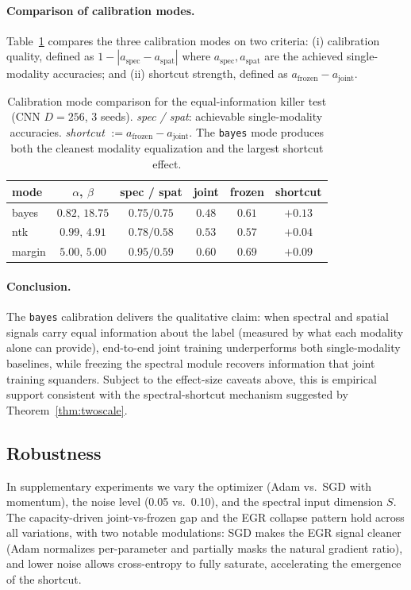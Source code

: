 \paragraph{Comparison of calibration modes.}
Table~\ref{tab:calib_modes} compares the three calibration modes on two
criteria: (i) calibration quality, defined as $1 -
|a_{\mathrm{spec}} - a_{\mathrm{spat}}|$ where $a_{\mathrm{spec}},
a_{\mathrm{spat}}$ are the achieved single-modality accuracies; and (ii)
shortcut strength, defined as $a_{\mathrm{frozen}} - a_{\mathrm{joint}}$.

\begin{table}[h]
\centering
\begin{tabular}{lccccc}
\toprule
mode    & $\alpha$, $\beta$    & spec / spat & joint & frozen & shortcut \\
\midrule
bayes   & $0.82,\, 18.75$ & $0.75 / 0.75$ & $0.48$ & $0.61$ & $\mathbf{+0.13}$ \\
ntk     & $0.99,\, 4.91$  & $0.78 / 0.58$ & $0.53$ & $0.57$ & $+0.04$ \\
margin  & $5.00,\, 5.00$  & $0.95 / 0.59$ & $0.60$ & $0.69$ & $+0.09$ \\
\bottomrule
\end{tabular}
\caption{Calibration mode comparison for the equal-information killer
test (CNN $D=256$, $3$ seeds). \emph{spec / spat}: achievable
single-modality accuracies. \emph{shortcut} $:= a_{\mathrm{frozen}} -
a_{\mathrm{joint}}$. The \texttt{bayes} mode produces both the cleanest
modality equalization and the largest shortcut effect.}
\label{tab:calib_modes}
\end{table}

\paragraph{Conclusion.} The \texttt{bayes} calibration delivers the
qualitative claim: when spectral and spatial signals carry equal
information about the label (measured by what each modality alone can
provide), end-to-end joint training underperforms both single-modality
baselines, while freezing the spectral module recovers information
that joint training squanders. Subject to the effect-size caveats
above, this is empirical support consistent with the
spectral-shortcut mechanism suggested by
Theorem~\ref{thm:twoscale}.

\subsection{Robustness}

In supplementary experiments we vary the optimizer (Adam vs.\ SGD with
momentum), the noise level (0.05 vs.\ 0.10), and the spectral input
dimension $S$. The capacity-driven joint-vs-frozen gap and the EGR
collapse pattern hold across all variations, with two notable
modulations: SGD makes the EGR signal cleaner (Adam normalizes
per-parameter and partially masks the natural gradient ratio), and
lower noise allows cross-entropy to fully saturate, accelerating the
emergence of the shortcut.

